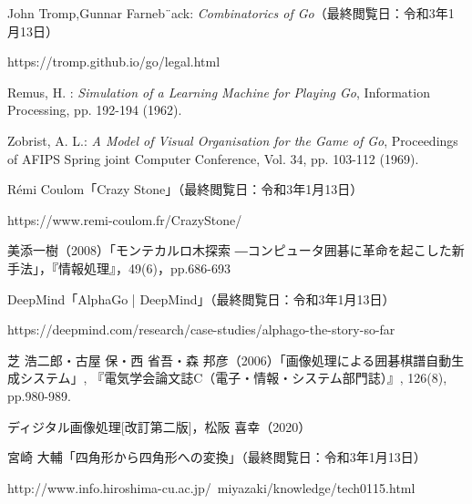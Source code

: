 \documentclass[openright]{nitocs}
\numberwithin{equation}{section}
\begin{document}
    \begin{thebibliography}{10} %


        John Tromp,Gunnar Farneb¨ack:
        {\it Combinatorics of Go}（最終閲覧日：令和3年1月13日）

        https://tromp.github.io/go/legal.html

        Remus, H. : 
        {\it Simulation of a Learning Machine for Playing Go}, 
        Information Processing, 
        pp. 192-194 (1962). 

        Zobrist, A. L.: 
        {\it A Model of Visual Organisation for the Game of Go}, 
        Proceedings of AFIPS Spring joint Computer Conference, 
        Vol. 34, pp. 103-112 (1969). 

        Rémi Coulom「Crazy Stone」（最終閲覧日：令和3年1月13日）

        https://www.remi-coulom.fr/CrazyStone/

        美添一樹（2008）「モンテカルロ木探索 ―コンピュータ囲碁に革命を起こした新手法」，『情報処理』，49(6)，pp.686-693

        DeepMind「AlphaGo | DeepMind」（最終閲覧日：令和3年1月13日）
        
        https://deepmind.com/research/case-studies/alphago-the-story-so-far

        芝 浩二郎・古屋 保・西 省吾・森 邦彦（2006）「画像処理による囲碁棋譜自動生成システム」,  『電気学会論文誌C（電子・情報・システム部門誌）』, 126(8), pp.980-989.

        ディジタル画像処理[改訂第二版]，松阪 喜幸（2020）

        宮崎 大輔「四角形から四角形への変換」（最終閲覧日：令和3年1月13日）

        http://www.info.hiroshima-cu.ac.jp/~miyazaki/knowledge/tech0115.html

    \end{thebibliography}
\end{document}
